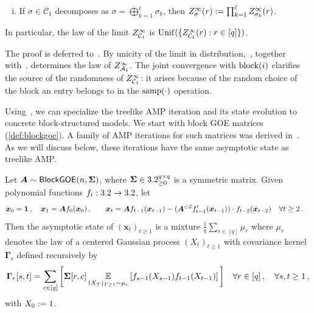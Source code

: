 \begin{lemma}
\begin{enumerate}[(i)]
        \item If $\sigma \in \mathcal C_1$ decomposes as
        $\sigma = \bigoplus_{k=1}^\ell \sigma_k$, then $Z^\infty_\sigma(r) := \prod_{k=1}^\ell Z^\infty_{\sigma_k}(r)$.
    \end{enumerate}
    In particular, the law of the limit $Z_{{\cal C}_1}^{\infty}$ is $\mathrm{Unif}(\{Z_{{\cal C}_1}^{\infty}(r): r \in [q]\})$.
\end{lemma}

\noindent The proof is deferred to~. By unicity of the limit in distribution,~, together with~, determines
the law of $Z^\infty_{{\cal A}_1}$.
The joint convergence with $\operatorname{block}(i)$ clarifies the source of the randomness
of $Z^\infty_{{\cal C}_1}$: it arises because of the random choice of the block an entry belongs to in the $\mathrm{samp}(\cdot)$ operation.

Using~,
we can specialize the treelike
AMP iteration and its state evolution
to concrete block-structured models.
We start with block GOE matrices (\cref{def:blockgoe}).
A family of AMP iterations for such matrices was derived in~\cite{rangan2011generalized, javanmard2013state}. As we will discuss below, these iterations
have the same asymptotic state as
treelike AMP.

\begin{theorem}\label{thm:block-goe-state}
    Let ${\bm A} \sim \textsf{\upshape BlockGOE}(n, \bm\Sigma)$, where  $\bm {\Sigma} \in 3.2_{\ge 0}^{q \times q}$ is a symmetric matrix.
    Given polynomial functions $f_t : 3.2 \to 3.2$, let
    \begin{alignat}{2}
        {\bm x}_0 &= \bm{1}\,,\quad \bm x_1 = \bm A f_0(\bm x_0)\,, \quad &{\bm x}_t &= {\bm A} f_{t-1}(\bm x_{t-1}) - (\bm A^{\odot 2}  f_{t-1}'(\bm x_{t-1})) \cdot f_{t-2}(\bm x_{t-2})\quad \forall t\ge 2\,.\label{eq:amp-block-goe}
    \end{alignat}
    Then the asymptotic state of $(\bm x_t)_{t\ge 1}$
    is a mixture $\frac 1q\sum_{r \in [q]} \mu_r$ where $\mu_r$ denotes the law of a centered Gaussian process $(X_t)_{t \geq 1}$ with covariance kernel $\bm \Gamma_r$ defined recursively by
    \[
        \bm \Gamma_{r}[s,t] = \sum_{c\in  [q]}\bigg[\mathbf{\Sigma}[r,c] \operatorname*{\mathbb{E}}_{(X_{T})_{T \ge 1} \sim \mu_c} \left[f_{s-1}(X_{s-1})f_{t-1}(X_{t-1})\right]\bigg]\quad \forall r \in [q]\,,\quad  \forall s,t\ge 1\,,
    \]
    with $X_0:= 1$.
\end{theorem}

